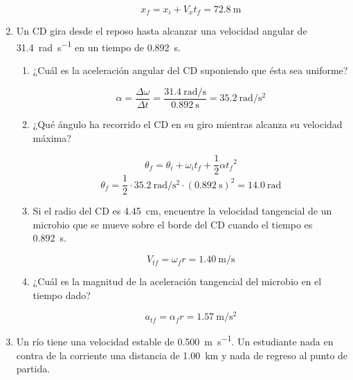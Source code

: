 \documentclass[Física - Práctica.root.tex]{subfiles}
\begin{document}
\begin{enumerate}
\begin{enumerate}
                \[x_f=x_i+V_xt_f=\boxed{\SI{72,8}{\meter}}\]
        \end{enumerate}

  \item Un CD gira desde el reposo hasta alcanzar una velocidad angular de \SI{31,4}{\radian\per\second} en un tiempo de \SI{0,892}{\second}.

        \begin{enumerate}
          \item ¿Cuál es la aceleración angular del CD suponiendo que ésta sea uniforme?

                \[\alpha=\frac{\Delta\omega}{\Delta t}=\frac{\SI{31,4}{\radian\per\second}}{\SI{0,892}{\second}}=\boxed{\SI{35,2}{\radian\per\second\squared}}\]

          \item ¿Qué ángulo ha recorrido el CD en su giro mientras alcanza su velocidad máxima?

                \[\theta_f=\theta_i+\omega_it_f+\frac{1}{2}\alpha{t_f}^2\]
                \[\theta_f=\frac{1}{2}\cdot\SI{35,2}{\radian\per\second\squared}\cdot(\SI{0,892}{\second})^2=\boxed{\SI{14,0}{\radian}}\]

          \item Si el radio del CD es \SI{4,45}{\cm}, encuentre la velocidad tangencial de un microbio que se mueve sobre el borde del CD cuando el tiempo es \SI{0,892}{\second}.

                \[V_{tf}=\omega_f r=\boxed{\SI{1,40}{\meter\per\second}}\]

          \item ¿Cuál es la magnitud de la aceleración tangencial del microbio en el tiempo dado?

                \[a_{tf}=\alpha_f r=\boxed{\SI{1,57}{\meter\per\second\squared}}\]
        \end{enumerate}

  \item Un río tiene una velocidad estable de \SI{0,500}{\meter\per\second}. Un estudiante nada en contra de la corriente una distancia de \SI{1,00}{\km} y nada de regreso al punto de partida.

        \begin{center}
        \end{center}


\end{enumerate}
\end{document}
